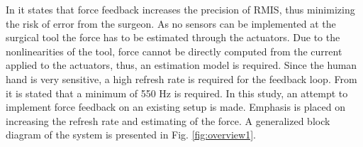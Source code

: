 




\vspace{5mm}

In \cite{RIGSP} it states that force feedback increases the precision of RMIS, thus minimizing the risk of error from the surgeon.  As no sensors can be implemented at the surgical tool the force has to be estimated through the actuators. Due to the nonlinearities of the tool, force cannot be directly computed from the current applied to the actuators, thus, an estimation model is required. 
Since the human hand is very sensitive, a high refresh rate is required for the feedback loop.
From \cite{coles2011role} it is stated that a minimum of 550 Hz is required. 
\vspace{5mm}
In this study, an attempt to implement force feedback on an existing setup is made. Emphasis is placed on increasing the refresh rate and estimating of the force. A generalized block diagram of the system is presented in Fig. \ref{fig:overview1}.

%


